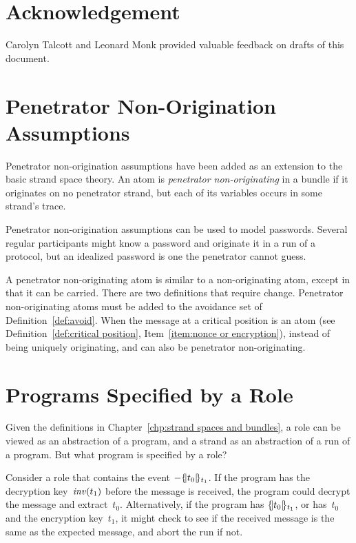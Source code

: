 \documentclass[12pt]{report}
\theoremstyle{definition}
\begin{document}
\chapter*{Acknowledgement}

Carolyn Talcott and Leonard Monk provided valuable feedback on drafts
of this document.

\appendix

\chapter{Penetrator Non-Origination Assumptions}\relax
\label{chp:penetrator non-origination}

Penetrator non-origination assumptions have been added as an extension
to the basic strand space theory.  An atom is \emph{penetrator
  non-originating} in a bundle if it originates on no penetrator
strand, but each of its variables occurs in some strand's trace.

Penetrator non-origination assumptions can be used to model
passwords.  Several regular participants might know a password and
originate it in a run of a protocol, but an idealized password is one
the penetrator cannot guess.

A penetrator non-originating atom is similar to a non-originating
atom, except in that it can be carried.  There are two definitions
that require change.  Penetrator non-originating atoms must be added
to the avoidance set of Definition~\ref{def:avoid}.  When the message
at a critical position is an atom (see Definition~\ref{def:critical
  position}, Item~\ref{item:nonce or encryption}), instead of being
uniquely originating, and can also be penetrator non-originating.

\chapter{Programs Specified by a Role}\label{chp:traces}

Given the definitions in Chapter~\ref{chp:strand spaces and bundles},
a role can be viewed as an abstraction of a program, and a strand as
an abstraction of a run of a program.  But what program is specified
by a role?

Consider a role that contains the event $\mathord -\{\!|t_0|\!\}_{t_1}$.  If
the program has the decryption key~$\operatorname{\mathit{inv}}(t_1)$ before the message
is received, the program could decrypt the message and extract~$t_0$.
Alternatively, if the program has $\{\!|t_0|\!\}_{t_1}$, or has~$t_0$ and
the encryption key~$t_1$, it might check to see if the received
message is the same as the expected message, and abort the run if not.
\end{document}
